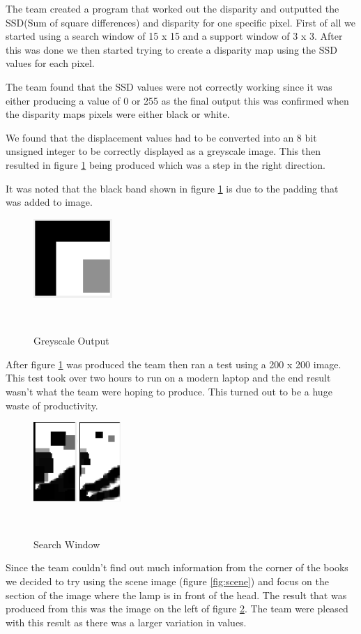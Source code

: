 \documentclass[twocolumn]{article}
\begin{document}
The team created a program that worked out the disparity and outputted the SSD(Sum of square differences) and disparity for one specific pixel. First of all we started using a search window of 15 x 15 and a support window of 3 x 3. After this was done we then started trying to create a disparity map using the SSD values for each pixel.  

The team found that the SSD values were not correctly working since it was either producing a value of 0 or 255 as the final output this was confirmed when the disparity maps pixels were either black or white. 

 We found that the displacement values had to be converted into an 8 bit unsigned integer to be correctly displayed as a greyscale image. This then resulted in figure \ref{fig:Third_Result} being produced which was a step in the right direction. 

It was noted that the black band shown in figure \ref{fig:Third_Result} is due to the padding that was added to image.  

\begin{figure}[H]
\centering
  \includegraphics[height=30mm]{Figures/Third_Result}
    \caption{Greyscale Output}~\label{fig:Third_Result}
\end{figure} 

After figure \ref{fig:Third_Result} was produced the team then ran a test using a 200 x 200 image. This test took over two hours to run on a modern laptop and the end result wasn't what the team were hoping to produce. This turned out to be a huge waste of productivity.  
 
\begin{figure}[H]
\centering
  \includegraphics[height=30mm]{Figures/Search_Window_Comparison}
    \caption{Search Window}~\label{fig:Search_Window}
\end{figure} 
Since the team couldn't find out much information from the corner of the books we decided to try using the scene image (figure \ref{fig:scene}) and focus on the section of the image where the lamp is in front of the head. The result that was produced from this was the image on the left of figure \ref{fig:Search_Window}. The team were pleased with this result as there was a larger variation in values. 
\end{document}
